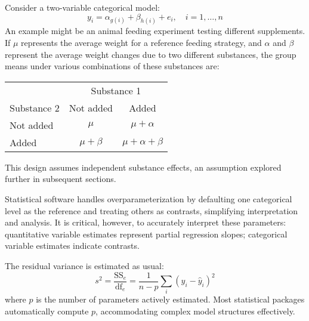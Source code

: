 \documentclass{article}
\begin{document}
Consider a two-variable categorical model:
\begin{equation*}
y_{i}=\alpha_{g(i)}+\beta_{h(i)}+e_{i}, \quad i=1, \ldots, n
\end{equation*}
An example might be an animal feeding experiment testing different supplements. If $\mu$ represents the average weight for a reference feeding strategy, and $\alpha$ and $\beta$ represent the average weight changes due to two different substances, the group means under various combinations of these substances are:
\begin{center}
\begin{tabular}{lcc}
\hline\hline
 & \multicolumn{2}{c}{Substance 1} \\
\cline { 2 - 3 }
Substance 2 & Not added & Added \\
\hline
Not added & $\mu$ & $\mu+\alpha$ \\
Added & $\mu+\beta$ & $\mu+\alpha+\beta$ \\
\hline
\end{tabular}
\end{center}
This design assumes independent substance effects, an assumption explored further in subsequent sections.

Statistical software handles overparameterization by defaulting one categorical level as the reference and treating others as contrasts, simplifying interpretation and analysis. It is critical, however, to accurately interpret these parameters: quantitative variable estimates represent partial regression slopes; categorical variable estimates indicate contrasts.

The residual variance is estimated as usual:
\begin{equation*}
s^{2}=\frac{\mathrm{SS}_{e}}{\mathrm{df}_{e}}=\frac{1}{n-p} \sum_{i}\left(y_{i}-\hat{y}_{i}\right)^{2}
\end{equation*}
where $p$ is the number of parameters actively estimated. Most statistical packages automatically compute $p$, accommodating complex model structures effectively.
\end{document}
